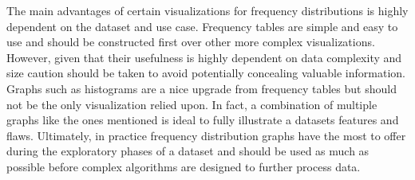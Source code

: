 
The main advantages of certain visualizations for frequency distributions is highly 
dependent on the dataset and use case. Frequency tables are simple and easy to 
use and should be constructed first over other more complex visualizations. 
However, given that their usefulness is highly dependent on data complexity and 
size caution should be taken to avoid potentially concealing valuable information. 
Graphs such as histograms are a nice upgrade from frequency tables but should not 
be the only visualization relied upon. In fact, a combination of multiple graphs 
like the ones mentioned is ideal to fully illustrate a datasets features and flaws. 
Ultimately, in practice frequency distribution graphs have the most to offer during 
the exploratory phases of a dataset and should be used as much as possible before 
complex algorithms are designed to further process data. 